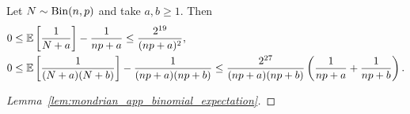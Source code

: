 \begin{lemma}%
  \label{lem:mondrian_app_binomial_expectation}
  Let $N \sim \operatorname{Bin}(n, p)$ and take $a, b \geq 1$. Then
  \begin{align*}
    0
    &\leq
    \mathbb{E} \left[
      \frac{1}{N+a}
    \right]
    - \frac{1}{n p+a}
    \leq
    \frac{2^{19}}{(n p+a)^2}, \\
    0
    &\leq
    \mathbb{E} \left[
      \frac{1}{(N+a)(N+b)}
    \right]
    - \frac{1}{(n p+a)(n p+b)}
    \leq
    \frac{2^{27}}{(n p +a)(n p +b)}
    \left(
      \frac{1}{n p + a}
      + \frac{1}{n p + b}
    \right).
  \end{align*}

\end{lemma}

\begin{proof}[Lemma~\ref{lem:mondrian_app_binomial_expectation}]


\end{proof}
